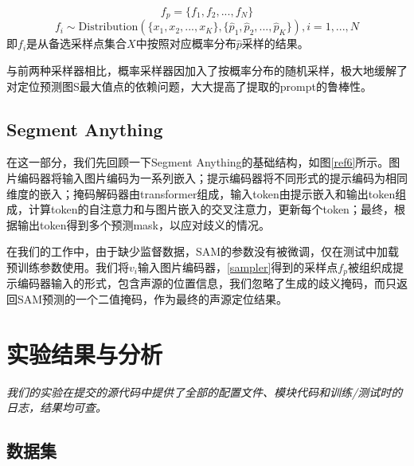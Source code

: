 \documentclass[12pt]{article}
\begin{document}
$$f_p = \{f_1, f_2, ..., f_N\}$$
$$f_i \sim \textrm{Distribution}(\{x_1, x_2, ..., x_K\}, \{\hat{p}_1, \hat{p}_2, ... ,\hat{p}_K\}),i=1,...,N$$
即$f_i$是从备选采样点集合$X$中按照对应概率分布$\hat{p}$采样的结果。

与前两种采样器相比，概率采样器因加入了按概率分布的随机采样，极大地缓解了对定位预测图S最大值点的依赖问题，大大提高了提取的prompt的鲁棒性。

\subsection{Segment Anything}\label{sam}
在这一部分，我们先回顾一下Segment Anything的基础结构，如图\ref{ref6}所示。图片编码器将输入图片编码为一系列嵌入；提示编码器将不同形式的提示编码为相同维度的嵌入；掩码解码器由transformer组成，输入token由提示嵌入和输出token组成，计算token的自注意力和与图片嵌入的交叉注意力，更新每个token；最终，根据输出token得到多个预测mask，以应对歧义的情况。

在我们的工作中，由于缺少监督数据，SAM的参数没有被微调，仅在测试中加载预训练参数使用。我们将$v_i$输入图片编码器，\ref{sampler}得到的采样点$f_p$被组织成提示编码器输入的形式，包含声源的位置信息，我们忽略了生成的歧义掩码，而只返回SAM预测的一个二值掩码，作为最终的声源定位结果。
\section{实验结果与分析}
\textit{我们的实验在提交的源代码中提供了全部的配置文件、模块代码和训练/测试时的日志，结果均可查。}

\subsection{数据集}
\end{document}
